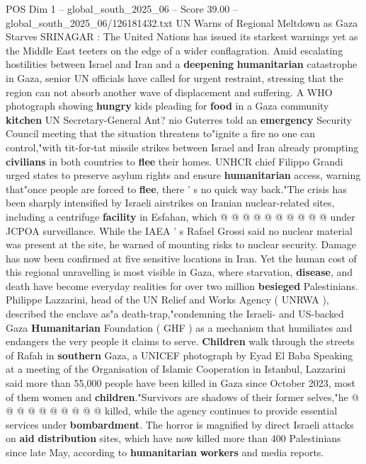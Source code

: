 \begin{textsample}{POS Dim 1 – global\_south\_2025\_06 – Score 39.00 – global\_south\_2025\_06/126181432.txt}  \label{ex:f1_pos_131}
UN Warns of Regional Meltdown as Gaza Starves SRINAGAR : The United Nations has issued its starkest warnings yet as the Middle East teeters on the edge of a wider conflagration.
Amid escalating hostilities between Israel and Iran and a \textbf{deepening} \textbf{humanitarian} catastrophe in Gaza, senior UN officials have called for urgent restraint, stressing that the region can not absorb another wave of displacement and suffering.
A WHO photograph showing \textbf{hungry} kids pleading for \textbf{food} in a Gaza community \textbf{kitchen} UN Secretary-General Ant? nio Guterres told an \textbf{emergency} Security Council meeting that the situation threatens to"ignite a fire no one can control,"with tit-for-tat missile strikes between Israel and Iran already prompting \textbf{civilians} in both countries to \textbf{flee} their homes.
UNHCR chief Filippo Grandi urged states to preserve asylum rights and ensure \textbf{humanitarian} access, warning that"once people are forced to \textbf{flee}, there ' s no quick way back."The crisis has been sharply intensified by Israeli airstrikes on Iranian nuclear-related sites, including a centrifuge \textbf{facility} in Esfahan, which @ @ @ @ @ @ @ @ @ @ under JCPOA surveillance.
While the IAEA ' s Rafael Grossi said no nuclear material was present at the site, he warned of mounting risks to nuclear security.
Damage has now been confirmed at five sensitive locations in Iran.
Yet the human cost of this regional unravelling is most visible in Gaza, where starvation, \textbf{disease}, and death have become everyday realities for over two million \textbf{besieged} Palestinians.
Philippe Lazzarini, head of the UN Relief and Works Agency ( UNRWA ), described the enclave as"a death-trap,"condemning the Israeli- and US-backed Gaza \textbf{Humanitarian} Foundation ( GHF ) as a mechanism that humiliates and endangers the very people it claims to serve. \textbf{Children} walk through the streets of Rafah in \textbf{southern} Gaza, a UNICEF photograph by Eyad El Baba Speaking at a meeting of the Organisation of Islamic Cooperation in Istanbul, Lazzarini said more than 55,000 people have been killed in Gaza since October 2023, most of them women and \textbf{children}."Survivors are shadows of their former selves,"he @ @ @ @ @ @ @ @ @ @ killed, while the agency continues to provide essential services under \textbf{bombardment}.
The horror is magnified by direct Israeli attacks on \textbf{aid} \textbf{distribution} sites, which have now killed more than 400 Palestinians since late May, according to \textbf{humanitarian} \textbf{workers} and media reports.

\end{textsample}
